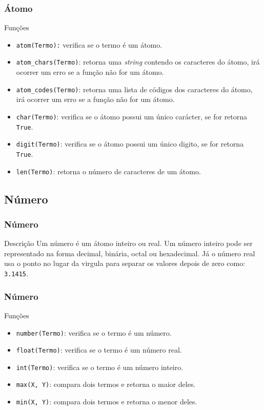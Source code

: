 \documentclass[sans]{beamer}
\begin{document}
\begin{frame}[fragile]   %
\frametitle{Átomo}
\begin{block}{Funções}
 \begin{itemize}
  \item \texttt{atom(Termo):} verifica se o termo é um átomo.
  \item \texttt{atom\_chars(Termo)}: retorna uma \textit{string} contendo os caracteres do átomo, irá ocorrer um erro se a função não for um átomo.
  \item \texttt{atom\_codes(Termo)}: retorna uma lista de códigos dos caracteres do átomo, irá ocorrer um erro se a função não for um átomo.
  \item \texttt{char(Termo)}: verifica se o átomo possui um único carácter, se for retorna \texttt{True}.
  \item \texttt{digit(Termo)}: verifica se o átomo possui um único digito, se for retorna \texttt{True}.
  \item \texttt{len(Termo)}: retorna o número de caracteres de um átomo.
 \end{itemize}

\end{block}
\end{frame}


\subsection{Número}
\begin{frame}[fragile]   %
\frametitle{Número}
\begin{block}{Descrição}
  Um número é um átomo inteiro ou real. 
  Um número inteiro pode ser representado na forma decimal, binária, octal ou hexadecimal.  
  Já o número real usa o ponto no lugar da virgula para separar os valores depois de zero como: \texttt{3.1415}.   
\end{block}
\end{frame}


\begin{frame}[fragile]   %
\frametitle{Número}
\begin{block}{Funções}
 \begin{itemize}
  \item \texttt{number(Termo)}: verifica se o termo é um número.
  \item \texttt{float(Termo)}: verifica se o termo é um número real.
  \item \texttt{int(Termo)}: verifica se o termo é um número inteiro.
  \item \texttt{max(X, Y)}: compara dois termos e retorna o maior deles.
  \item \texttt{min(X, Y)}: compara dois termos e retorna o menor deles.
 \end{itemize}

\end{block}
\end{frame}
\end{document}
